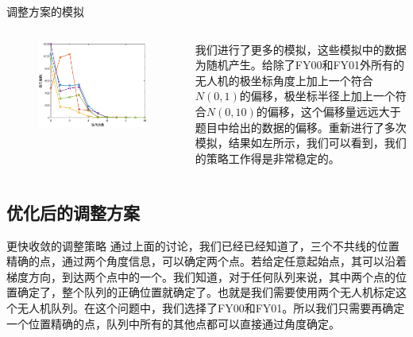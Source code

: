 \documentclass[aspectratio=169]{beamer}
\begin{document}
\begin{frame}{调整方案的模拟}
    \begin{columns}
        \begin{figure}[!ht]
            \centering
            \includegraphics[width=\textwidth]{图片/多次尝试.eps}
        \end{figure}

        我们进行了更多的模拟，这些模拟中的数据为随机产生。给除了FY00和FY01外所有的无人机的极坐标角度上加上一个符合$N(0,1)$的偏移，极坐标半径上加上一个符合$N(0,10)$的偏移，这个偏移量远远大于题目中给出的数据的偏移。重新进行了多次模拟，结果如左所示，我们可以看到，我们的策略工作得是非常稳定的。
    \end{columns}
\end{frame}

\subsection{优化后的调整方案}

\begin{frame}{更快收敛的调整策略}
    通过上面的讨论，我们已经已经知道了，三个不共线的位置精确的点，通过两个角度信息，可以确定两个点。若给定任意起始点，其可以沿着梯度方向，到达两个点中的一个。我们知道，对于任何队列来说，其中两个点的位置确定了，整个队列的正确位置就确定了。也就是我们需要使用两个无人机标定这个无人机队列。在这个问题中，我们选择了FY00和FY01。所以我们只需要再确定一个位置精确的点，队列中所有的其他点都可以直接通过角度确定。
\end{frame}
\end{document}
